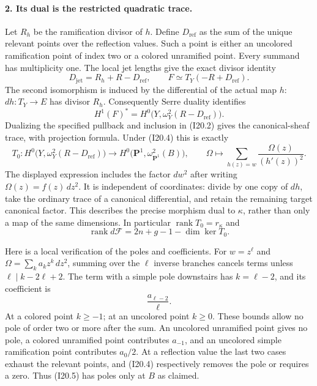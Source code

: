 \paragraph{2. Its dual is the restricted quadratic trace.}
Let $R_h$ be the ramification divisor of $h$. Define
$D_{\mathrm{ref}}$ as the sum of the unique relevant points
over the reflection values. Such a point is either an uncolored
ramification point of index two or a colored unramified point.
Every summand has multiplicity one. The local jet lengths give
the exact divisor identity
\begin{equation}
 D_{\mathrm{jet}}=R_h+R-D_{\mathrm{ref}},
 \qquad F\simeq T_Y(-R+D_{\mathrm{ref}}).              \tag{I20.4}
\end{equation}
The second isomorphism is induced by the differential of the
actual map $h$: $dh:T_Y\to E$ has divisor $R_h$.
Consequently Serre duality identifies
\[
 H^1(F)^*=H^0\bigl(Y,\omega_Y^2(R-D_{\mathrm{ref}})\bigr).
\]
Dualizing the specified pullback and inclusion in (I20.2)
gives the canonical-sheaf trace, with projection formula.
Under (I20.4) this is exactly
\begin{equation}
 T_0:H^0\bigl(Y,\omega_Y^2(R-D_{\mathrm{ref}})\bigr)
       \longrightarrow
       H^0\bigl(\mathbf P^1,\omega_{\mathbf P^1}^2(B)\bigr),
 \qquad
 \Omega\longmapsto
       \sum_{h(z)=w}\frac{\Omega(z)}{(h'(z))^2}.
                                                        \tag{I20.5}
\end{equation}
The displayed expression includes the factor $dw^2$ after
writing $\Omega(z)=f(z)\,dz^2$. It is independent of coordinates:
divide by one copy of $dh$, take the ordinary trace of a
canonical differential, and retain the remaining target
canonical factor. This describes the precise morphism dual
to $\kappa$, rather than only a map of the same dimensions.
In particular $\operatorname{rank}T_0=r_\kappa$ and
\begin{equation}
 \boxed{\operatorname{rank}d\mathcal F
             =2n+g-1-\dim\ker T_0.}                  \tag{I20.6}
\end{equation}

Here is a local verification of the poles and coefficients.
For $w=z^\ell$ and
$\Omega=\sum_k a_k z^k\,dz^2$, summing over the $\ell$
inverse branches cancels terms unless
$\ell\mid k-2\ell+2$. The term with a simple pole downstairs
has $k=\ell-2$, and its coefficient is
\begin{equation}
                    \frac{a_{\ell-2}}{\ell}.
                                                        \tag{I20.7}
\end{equation}
At a colored point $k\geq-1$; at an uncolored point $k\geq0$.
These bounds allow no pole of order two or more after the
sum. An uncolored unramified point gives no pole, a colored
unramified point contributes $a_{-1}$, and an uncolored
simple ramification point contributes $a_0/2$.
At a reflection value the last two cases exhaust the relevant
points, and (I20.4) respectively removes the pole or requires
a zero. Thus (I20.5) has poles only at $B$ as claimed.

